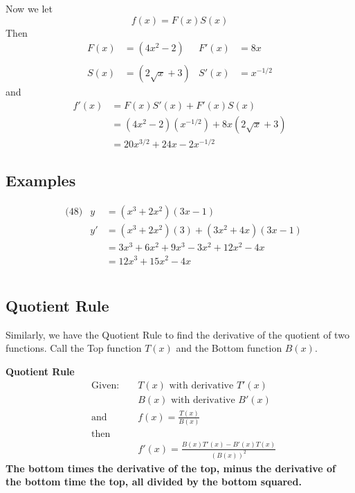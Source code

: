\documentclass[14pt]{extarticle}
\begin{document}
Now we let
$$f(x) = F(x)S(x)$$
Then
\begin{align*}
	F(x) &= (4x^2 -2) & F'(x)&=8x \\\\
	S(x) &= (2\sqrt{x}+3) & S'(x)&= x^{-1/2}
\end{align*}
and
\begin{align*}
	f'(x) &= F(x)S'(x) + F'(x)S(x) \\
	&= (4x^2 -2)(x^{-1/2}) + 8x(2\sqrt{x}+3) \\
	&= 20x^{3/2} + 24x - 2x^{-1/2}
\end{align*}

\subsection*{Examples}
\begin{align*}
	&\text{(48)} &y &= (x^3 + 2x^2)(3x-1) \\
	&			&y' &= (x^3 + 2x^2)(3) + (3x^2 + 4x)(3x -1) \\
	&			&    &= 3x^3 +6x^2 +  9x^3 - 3x^2 + 12x^2 -4x\\
	&			&    &= 12x^3 + 15x^2 - 4x\\\\
\end{align*}


\subsection*{Quotient Rule}
Similarly, we have the Quotient Rule to find the derivative of the quotient of two functions. Call the Top function $T(x)$ and the Bottom function $B(x)$.

\begin{tcolorbox}[enhanced jigsaw,colback=bg,boxrule=0pt,arc=0pt]
	\textbf{Quotient Rule}
	\begin{align*}
		&\text{Given: } & &T(x) \text{ with derivative } T'(x) \\
		& & &B(x) \text{ with derivative } B'(x) \\
		&\text{and } & &f(x) = \frac{T(x)}{B(x)} \\
		&\text{then }\\
		& & &f'(x) = \frac{B(x)T'(x) - B'(x)T(x)}{(B(x))^2}
	\end{align*}
	\textbf{The bottom times the derivative of the top, minus the derivative of the bottom time the top, all divided by the bottom squared.}
\end{tcolorbox}
\end{document}

